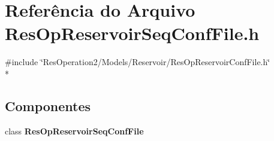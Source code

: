 \section{Referência do Arquivo Res\+Op\+Reservoir\+Seq\+Conf\+File.\+h}
\label{_res_op_reservoir_seq_conf_file_8h}
{\ttfamily \#include \char`\"{}Res\+Operation2/\+Models/\+Reservoir/\+Res\+Op\+Reservoir\+Conf\+File.\+h\char`\"{}}\\*
\subsection*{Componentes}
\begin{DoxyCompactItemize}
\item 
class {\bf Res\+Op\+Reservoir\+Seq\+Conf\+File}
\end{DoxyCompactItemize}
